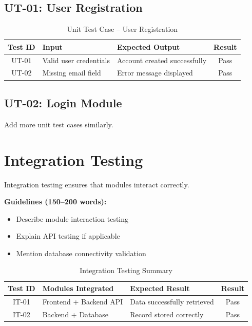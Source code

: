 \subsection{UT-01: User Registration}

\begin{table}[h]
\centering
\caption{Unit Test Case – User Registration}
\begin{tabularx}{\textwidth}{|c|X|X|c|}
\hline
\textbf{Test ID} & \textbf{Input} & \textbf{Expected Output} & \textbf{Result} \\
\hline
UT-01 & Valid user credentials & Account created successfully & Pass \\
\hline
UT-02 & Missing email field & Error message displayed & Pass \\
\hline
\end{tabularx}
\end{table}

\subsection{UT-02: Login Module}

Add more unit test cases similarly.


\section{Integration Testing}

Integration testing ensures that modules interact correctly.

\textbf{Guidelines (150–200 words):}
\begin{itemize}
    \item Describe module interaction testing
    \item Explain API testing if applicable
    \item Mention database connectivity validation
\end{itemize}

\begin{table}[h]
\centering
\caption{Integration Testing Summary}
\begin{tabularx}{\textwidth}{|c|X|X|c|}
\hline
\textbf{Test ID} & \textbf{Modules Integrated} & \textbf{Expected Result} & \textbf{Result} \\
\hline
IT-01 & Frontend + Backend API & Data successfully retrieved & Pass \\
\hline
IT-02 & Backend + Database & Record stored correctly & Pass \\
\hline
\end{tabularx}
\end{table}

